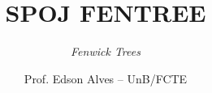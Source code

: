 \title{SPOJ FENTREE}
\subtitle{\textit{Fenwick Trees}}
\author{Prof. Edson Alves -- UnB/FCTE}
\date{}

